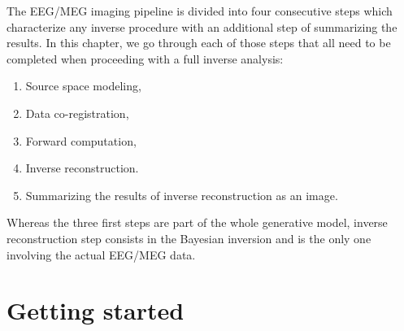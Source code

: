 The EEG/MEG imaging pipeline is divided into four consecutive steps which characterize
any inverse procedure with an additional step of summarizing the results. In this chapter, we go through each of those steps that all need 
to be completed when proceeding with a full inverse analysis:

\begin{enumerate}
    \item Source space modeling,
    \item Data co-registration,
    \item Forward computation,
    \item Inverse reconstruction.
    \item Summarizing the results of inverse reconstruction as an image.
\end{enumerate}

Whereas the three first steps are part of the whole generative model, inverse reconstruction
step consists in the Bayesian inversion and is the only one involving the actual EEG/MEG data.\\

\section{Getting started}

